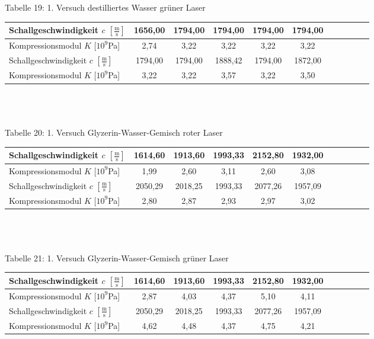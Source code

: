 \documentclass[fontsize=12pt]{scrartcl}
\begin{document}
\newpage
\noindent
Tabelle 19: 1. Versuch destilliertes Wasser grüner Laser \\
\begin{tabular}{|l|c|c|c|c|c|c|c|c|c|c|} \hline
Schallgeschwindigkeit $c$ $[\frac{{\text{m}}}{{\text{s}}}]$ & 1656,00 & 1794,00 & 1794,00 & 1794,00 & 1794,00 \\ \hline
Kompressionsmodul $K$ [$10^9$Pa] &  2,74 & 3,22 & 3,22 & 3,22 & 3,22 \\ \hline
Schallgeschwindigkeit $c$ $[\frac{{\text{m}}}{{\text{s}}}]$ & 1794,00 &1794,00 & 1888,42 & 1794,00 & 1872,00 \\ \hline
Kompressionsmodul $K$ [$10^9$Pa] & 3,22 & 3,22 & 3,57 & 3,22 & 3,50 \\ \hline
\end{tabular} \\

~\\
~\\ 
Tabelle 20: 1. Versuch Glyzerin-Wasser-Gemisch roter Laser \\
\begin{tabular}{|l|c|c|c|c|c|c|c|c|c|c|} \hline
Schallgeschwindigkeit $c$ $[\frac{{\text{m}}}{{\text{s}}}]$ & 1614,60 & 1913,60 & 1993,33 & 2152,80 & 1932,00    \\ \hline
Kompressionsmodul $K$ [$10^9$Pa] & 1,99 & 2,60 & 3,11 & 2,60 & 3,08  \\ \hline
Schallgeschwindigkeit $c$ $[\frac{{\text{m}}}{{\text{s}}}]$ &  2050,29 & 2018,25 & 1993,33 & 2077,26 & 1957,09 \\ \hline
Kompressionsmodul $K$ [$10^9$Pa] & 2,80 & 2,87 & 2,93 & 2,97 & 3,02 \\ \hline
\end{tabular} \\

~\\
~\\
Tabelle 21: 1. Versuch Glyzerin-Wasser-Gemisch grüner Laser\\
\begin{tabular}{|l|c|c|c|c|c|c|c|c|c|c|} \hline
Schallgeschwindigkeit $c$ $[\frac{{\text{m}}}{{\text{s}}}]$ & 1614,60 & 1913,60 & 1993,33 & 2152,80 & 1932,00  \\ \hline
Kompressionsmodul $K$ [$10^9$Pa] & 2,87 & 4,03 & 4,37 & 5,10 & 4,11  \\ \hline
Schallgeschwindigkeit $c$ $[\frac{{\text{m}}}{{\text{s}}}]$ & 2050,29 &  2018,25 & 1993,33 & 2077,26 & 1957,09  \\ \hline
Kompressionsmodul $K$ [$10^9$Pa]  & 4,62 & 4,48 & 4,37 & 4,75 & 4,21  \\ \hline
\end{tabular} \\
\end{document}
